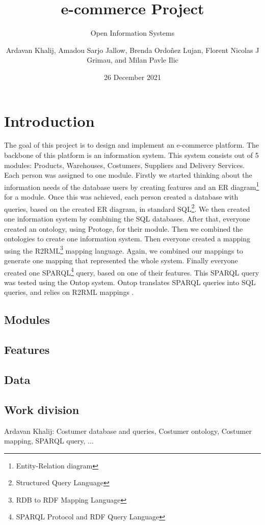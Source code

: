 \documentclass{article}
\title{e-commerce Project}
\subtitle{Open Information Systems}
\author{Ardavan Khalij, Amadou Sarjo Jallow, Brenda Ordoñez Lujan, Florent Nicolas J Grimau, and Milan Pavle Ilic}
\date{26 December 2021}
\begin{document}
\maketitle
\tableofcontents
\newpage
\section{Introduction}
The goal of this project is to design and implement an e-commerce platform. The backbone of this platform is an information system. This system consists out of 5 modules: Products, Warehouses, Costumers, Suppliers and Delivery Services. \\

Each person was assigned to one module. Firstly we started thinking about the information needs of the database users by creating features and an ER diagram\footnote{Entity-Relation diagram} for a module. Once this was achieved, each person created a database with queries, based on the created ER diagram, in standard SQL\footnote{Structured Query Language}. We then created one information system by combining the SQL databases. After that, everyone created an ontology, using Protoge, for their module. Then we combined the ontologies to create one information system. Then everyone created a mapping using the R2RML\footnote{RDB to RDF Mapping Language} mapping language. Again, we combined our mappings to generate one mapping that represented the whole system. Finally everyone created one SPARQL\footnote{SPARQL Protocol and RDF Query Language} query, based on one of their features. This SPARQL query was tested using the Ontop system. Ontop translates SPARQL queries into SQL queries, and relies on R2RML mappings \cite{OntopVK}.

\subsection{Modules}

\subsection{Features}

\subsection{Data}


\subsection{Work division}
Ardavan Khalij: Costumer database and queries, Costumer ontology, Costumer mapping, SPARQL query, ...
\\
\end{document}
